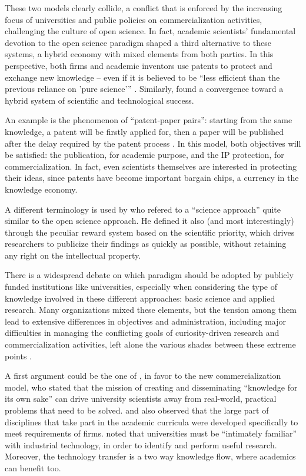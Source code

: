 These two models clearly collide, a conflict that is enforced by the increasing focus of universities and public policies on commercialization activities, challenging the culture of open science. In fact, academic scientists' fundamental devotion to the open science paradigm shaped a third alternative to these systems, a hybrid economy with mixed elements from both parties. In this perspective, both firms and academic inventors use patents to protect and exchange new knowledge – even if it is believed to be \enquote{less efficient than the previous reliance on 'pure science'} \citep{Geuna2009}. Similarly, \citet{OwenSmith2001} found a convergence toward a hybrid system of scientific and technological success.

An example is the phenomenon of \enquote{patent-paper pairs}: starting from the same knowledge, a patent will be firstly applied for, then a paper will be published after the delay required by the patent process \citep{Murray2005}. In this model, both objectives will be satisfied: the publication, for academic purpose, and the IP protection, for commercialization. In fact, even scientists themselves are interested in protecting their ideas, since patents have become important bargain chips, a currency in the knowledge economy.

A different terminology is used by \citet{Stern2004} who refered to a \enquote{science approach} quite similar to the open science approach. He defined it also (and most interestingly) through the peculiar reward system based on the scientific priority, which drives researchers to publicize their findings as quickly as possible, without retaining any right on the intellectual property. 

There is a widespread debate on which paradigm should be adopted by publicly funded institutions like universities, especially when considering the type of knowledge involved in these different approaches: basic science and applied research. Many organizations mixed these elements, but the tension among them lead to extensive differences in objectives and administration, including major difficulties in managing the conflicting goals of curiosity-driven research and commercialization activities, left alone the various shades between these extreme points \citep{Rasmussen2006}.

A first argument could be the one of \citet{Geuna2009}, in favor to the new commercialization model, who stated that the mission of creating and disseminating \enquote{knowledge for its own sake} can drive university scientists away from real-world, practical problems that need to be solved. \citet{Rosenberg1994} and \citet{Nelson1998} also observed that the large part of disciplines that take part in the academic curricula were developed specifically to meet requirements of firms. \citet{Balconi2006} noted that universities must be \enquote{intimately familiar} with industrial technology, in order to identify and perform useful research. Moreover, the technology transfer is a two way knowledge flow, where academics can benefit too.

